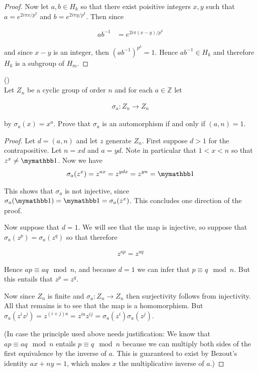 \documentclass{exam}
\begin{document}
\begin{questions}
\begin{proof}
  Now let $a,b\in H_k$ so that there exist poisitive integers $x,y$ such that $a=e^{2i\pi x/p^k}$ and $b=e^{2i\pi y/p^k}$.  Then since

  \begin{align*}
    ab^{-1} &= e^{2i\pi(x-y)/p^k}
  \end{align*}

  and since $x-y$ is an integer, then $(ab^{-1})^{p^k}=1$.  Hence $ab^{-1}\in H_k$ and therefore $H_k$ is a subgroup of $H_m$.
\end{proof}

\vspace{1cm}

\question() \\
Let $Z_n$ be a cyclic group of order $n$ and for each $a\in\mathbb Z$ let

\begin{align*}
  \sigma_a: Z_n\rightarrow Z_n
\end{align*}

by $\sigma_a(x)=x^a$.  Prove that $\sigma_a$ is an automorphism if and only if $(a,n)=1$.

\begin{proof}
  Let $d=(a,n)$ and let $z$ generate $Z_n$.  First suppose $d>1$ for the contrapositive.  Let $n=xd$ and $a=yd$.  Note in particular that $1<x<n$ so that $z^x\ne \mymathbb 1$. Now we have
  \begin{align*}
    \sigma_a(z^x)=z^{ax}=z^{ydx}=z^{yn}=\mymathbb 1
  \end{align*}

  This shows that $\sigma_a$ is not injective, since $\sigma_a(\mymathbb 1)=\mymathbb 1=\sigma_a(z^x)$.  This concludes one direction of the proof.

  Now suppose that $d=1$.  We will see that the map is injective, so suppose that $\sigma_a(z^p)=\sigma_a(z^q)$ so that therefore

  \begin{align*}
    z^{ap}=z^{aq}
  \end{align*}

  Hence $ap\equiv aq\mod n$, and because $d=1$ we can infer that $p\equiv q\mod n$.  But this entails that $z^p=z^q$.

  Now since $Z_n$ is finite and $\sigma_a:Z_n\rightarrow Z_n$ then surjectivity follows from injectivity.  All that remains is to see that the map is a homomorphism.  But $\sigma_a(z^iz^j)=z^{(i+j)a}=z^{ia}z^{ij}=\sigma_a(z^i)\sigma_a(z^j)$.

  (In case the principle used above needs justification:  We know that $ap\equiv aq \mod n$ entails $p\equiv q\mod n$ because we can multiply both sides of the first equivalence by the inverse of $a$. This is guaranteed to exist by Bezout's identity $ax+ny=1$, which makes $x$ the multiplicative inverse of $a$.)


\end{proof}
\end{questions}
\end{document}
